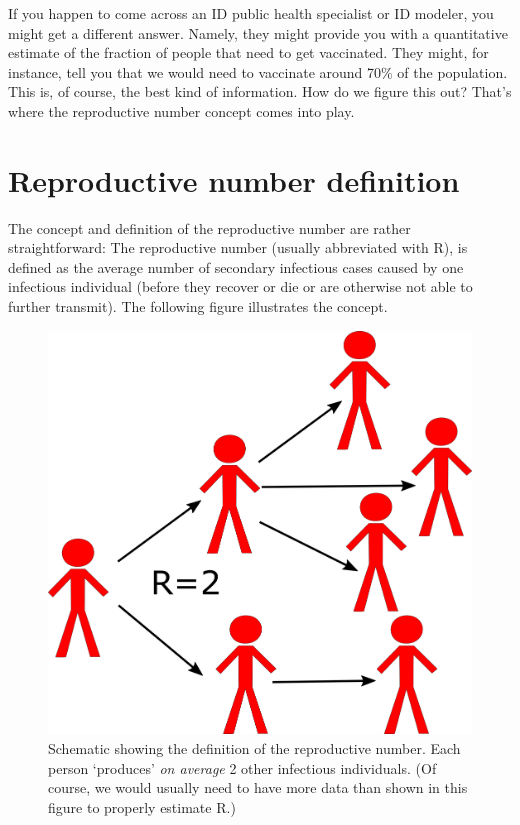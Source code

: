 \documentclass[]{book}
\theoremstyle{definition}
\theoremstyle{definition}
\theoremstyle{definition}
\theoremstyle{remark}
\begin{document}
If you happen to come across an ID public health specialist or ID
modeler, you might get a different answer. Namely, they might provide
you with a quantitative estimate of the fraction of people that need to
get vaccinated. They might, for instance, tell you that we would need to
vaccinate around 70\% of the population. This is, of course, the best
kind of information. How do we figure this out? That's where the
reproductive number concept comes into play.

\hypertarget{reproductive-number-definition}{%
\section{Reproductive number
definition}\label{reproductive-number-definition}}

The concept and definition of the reproductive number are rather
straightforward: The reproductive number (usually abbreviated with R),
is defined as the average number of secondary infectious cases caused by
one infectious individual (before they recover or die or are otherwise
not able to further transmit). The following figure illustrates the
concept.

\begin{figure}
\centering
\includegraphics{./images/R0scheme.png}
\caption{Schematic showing the definition of the reproductive number.
Each person `produces' \emph{on average} 2 other infectious individuals.
(Of course, we would usually need to have more data than shown in this
figure to properly estimate R.)}
\end{figure}
\end{document}
